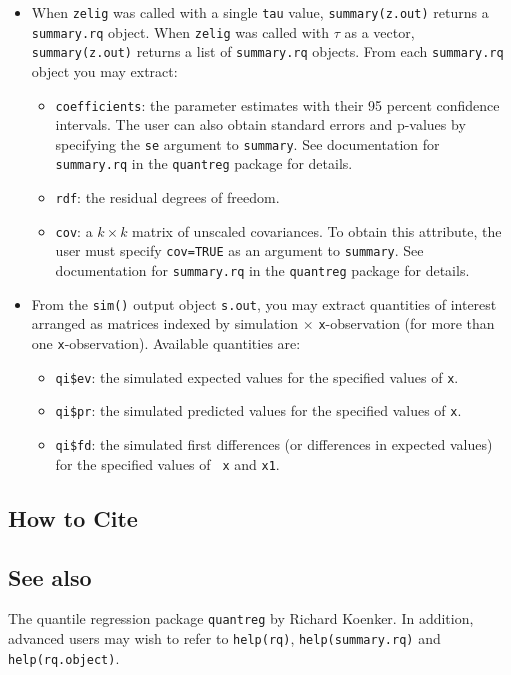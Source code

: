 \begin{itemize}
\item When {\tt zelig} was called with a single {\tt tau} value,
   {\tt summary(z.out)} returns a {\tt summary.rq} object. When {\tt zelig}
   was called with $\tau$ as a vector, {\tt summary(z.out)} returns a list
   of {\tt summary.rq} objects. From each {\tt summary.rq} object you may
   extract:
   \begin{itemize}
   \item {\tt coefficients}: the parameter estimates with their 95 percent
     confidence intervals. The user can also obtain standard errors and p-values
     by specifying the {\tt se} argument to {\tt summary}. See documentation
     for {\tt summary.rq} in the {\tt quantreg} package for details.
   \item {\tt rdf}: the residual degrees of freedom.
   \item{\tt cov}: a $k \times k$ matrix of unscaled covariances. To obtain
     this attribute, the user must specify {\tt cov=TRUE} as an argument to 
     {\tt summary}. See documentation for {\tt summary.rq} in the
     {\tt quantreg} package for details.
   \end{itemize}
   
\item From the {\tt sim()} output object {\tt s.out}, you may extract
  quantities of interest arranged as matrices indexed by simulation
  $\times$ {\tt x}-observation (for more than one {\tt x}-observation).
  Available quantities are:

   \begin{itemize}
   \item {\tt qi\$ev}: the simulated expected values for the specified
     values of {\tt x}.
   \item {\tt qi\$pr}: the simulated predicted values for the specified
     values of {\tt x}.
   \item {\tt qi\$fd}:  the simulated first differences (or
     differences in expected values) for the specified values of {\tt
       x} and {\tt x1}. 
   \end{itemize}
\end{itemize}

\subsection* {How to Cite} 


\subsection* {See also}
The quantile regression package {\tt quantreg} by Richard Koenker. In addition, advanced users may wish to refer to \texttt{help(rq)}, \texttt{help(summary.rq)} and \texttt{help(rq.object)}.
